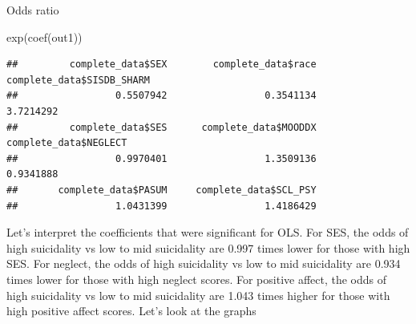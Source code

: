 \documentclass[
]{article}
\newenvironment{Shaded}{\begin{snugshade}}{\end{snugshade}}
\newcommand{\AttributeTok}[1]{\textcolor[rgb]{0.77,0.63,0.00}{#1}}
\newcommand{\CommentTok}[1]{\textcolor[rgb]{0.56,0.35,0.01}{\textit{#1}}}
\newcommand{\DecValTok}[1]{\textcolor[rgb]{0.00,0.00,0.81}{#1}}
\newcommand{\FunctionTok}[1]{\textcolor[rgb]{0.00,0.00,0.00}{#1}}
\newcommand{\NormalTok}[1]{#1}
\newcommand{\OtherTok}[1]{\textcolor[rgb]{0.56,0.35,0.01}{#1}}
\newcommand{\SpecialCharTok}[1]{\textcolor[rgb]{0.00,0.00,0.00}{#1}}
\begin{document}
Odds ratio

\begin{Shaded}
\begin{Highlighting}[]
\FunctionTok{exp}\NormalTok{(}\FunctionTok{coef}\NormalTok{(out1))}
\end{Highlighting}
\end{Shaded}

\begin{verbatim}
##         complete_data$SEX        complete_data$race complete_data$SISDB_SHARM 
##                 0.5507942                 0.3541134                 3.7214292 
##         complete_data$SES      complete_data$MOODDX     complete_data$NEGLECT 
##                 0.9970401                 1.3509136                 0.9341888 
##       complete_data$PASUM     complete_data$SCL_PSY 
##                 1.0431399                 1.4186429
\end{verbatim}

Let's interpret the coefficients that were significant for OLS. For SES,
the odds of high suicidality vs low to mid suicidality are 0.997 times
lower for those with high SES. For neglect, the odds of high suicidality
vs low to mid suicidality are 0.934 times lower for those with high
neglect scores. For positive affect, the odds of high suicidality vs low
to mid suicidality are 1.043 times higher for those with high positive
affect scores. Let's look at the graphs

\begin{Shaded}
\end{Shaded}
\end{document}
